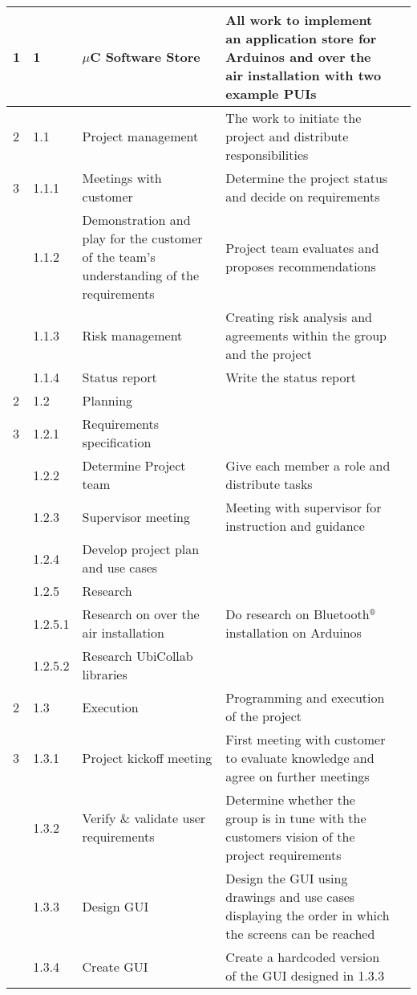 \begin{longtable}{|m{}|m{}|m{}|m{}|m{}|}
	1 & 1 & $\mu$C Software Store & All work to implement an application store for Arduinos and over the air installation with two example PUIs & \\
\hline
	2 & 1.1 & Project management & The work to initiate the project and distribute responsibilities & \\
\hline
	3 & 1.1.1 & Meetings with customer & Determine the project status and decide on requirements & \\
\hline
	 & 1.1.2 & Demonstration and play for the customer of the team's understanding of the requirements & Project team evaluates and proposes recommendations & \\
\hline
	 & 1.1.3 & Risk management & Creating risk analysis and agreements within the group and the project & \\
\hline
	 & 1.1.4 & Status report & Write the status report & \\
\hline
	2 & 1.2 & Planning & & \\
\hline
	3 & 1.2.1 & Requirements specification & & \\
\hline
	 & 1.2.2 & Determine Project team & Give each member a role and distribute tasks & \\
\hline
	 & 1.2.3 & Supervisor meeting & Meeting with supervisor for instruction and guidance & \\
\hline
	 & 1.2.4 & Develop project plan and use cases & & \\
\hline
	 & 1.2.5 & Research & & \\
\hline
	 & 1.2.5.1 & Research on over the air installation & Do research on Bluetooth$\textsuperscript{\textregistered}$ installation on Arduinos & \\
\hline
	 & 1.2.5.2 & Research UbiCollab libraries & & \\
\hline
	2 & 1.3 & Execution & Programming and execution of the project & \\
\hline
	3 & 1.3.1 & Project kickoff meeting & First meeting with customer to evaluate knowledge and agree on further meetings & \\
\hline
	 & 1.3.2 & Verify \& validate user requirements & Determine whether the group is in tune with the customers vision of the project requirements & \\
\hline
	 & 1.3.3 & Design GUI & Design the GUI using drawings and use cases displaying the order in which the screens can be reached & \\
\hline	
	 & 1.3.4 & Create GUI & Create a hardcoded version of the GUI designed in 1.3.3 & \\

\end{longtable}
